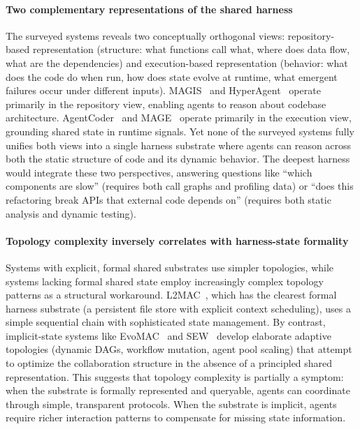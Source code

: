 \documentclass{llmxive}
\begin{document}
\paragraph{Two complementary representations of the shared harness}
The surveyed systems reveals two conceptually orthogonal views:
repository-based representation (structure: what functions call
what, where does data flow, what are the dependencies) and
execution-based representation (behavior: what does the code do
when run, how does state evolve at runtime, what emergent
failures occur under different inputs). MAGIS~\cite{Tao2024Magis}
and HyperAgent~\cite{Phan2024HyperAgent} operate primarily in the
repository view, enabling agents to reason about codebase
architecture. AgentCoder~\cite{huang2023agentcoder} and
MAGE~\cite{Zhao2024MAGE} operate primarily in the execution view,
grounding shared state in runtime signals. Yet none of the
surveyed systems fully unifies both views into a single harness
substrate where agents can reason across both the static
structure of code and its dynamic behavior. The deepest harness
would integrate these two perspectives, answering questions like
``which components are slow'' (requires both call graphs and
profiling data) or ``does this refactoring break APIs that
external code depends on'' (requires both static analysis and
dynamic testing).

\paragraph{Topology complexity inversely correlates with harness-state formality}
Systems with explicit, formal shared substrates use simpler
topologies, while systems lacking formal shared state employ
increasingly complex topology patterns as a structural
workaround. L2MAC~\cite{Holt2023L2MAC}, which has the clearest
formal harness substrate (a persistent file store with explicit
context scheduling), uses a simple sequential chain with
sophisticated state management. By contrast,
implicit-state systems like EvoMAC~\cite{Hu2025EvoMAC} and
SEW~\cite{Liu2025SEW} develop elaborate adaptive topologies
(dynamic DAGs, workflow mutation, agent pool scaling) that
attempt to optimize the collaboration structure in the absence of
a principled shared representation. This suggests that topology
complexity is partially a symptom: when the substrate is
formally represented and queryable, agents can coordinate through
simple, transparent protocols. When the substrate is implicit,
agents require richer interaction patterns to compensate for
missing state information.
\end{document}
